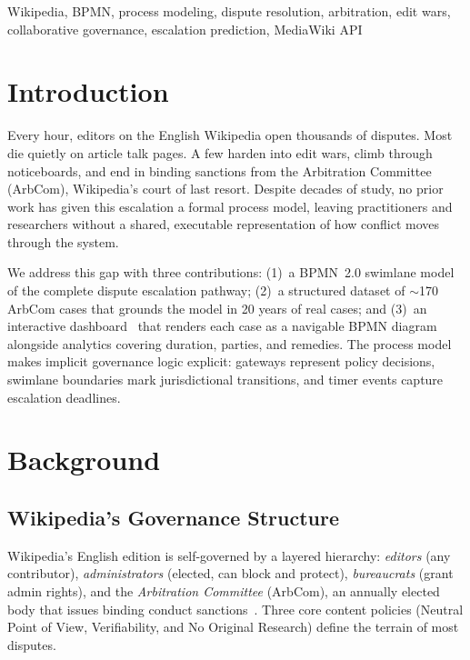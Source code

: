 \documentclass[conference]{IEEEtran}
\begin{document}
\begin{IEEEkeywords}
Wikipedia, BPMN, process modeling, dispute resolution, arbitration, edit wars,
collaborative governance, escalation prediction, MediaWiki API
\end{IEEEkeywords}

\section{Introduction}

Every hour, editors on the English Wikipedia open thousands of disputes. Most
die quietly on article talk pages. A few harden into edit wars, climb through
noticeboards, and end in binding sanctions from the Arbitration Committee
(ArbCom), Wikipedia's court of last resort. Despite decades of study, no
prior work has given this escalation a formal process model, leaving
practitioners and researchers without a shared, executable representation of
how conflict moves through the system.

We address this gap with three contributions: (1)~a BPMN~2.0 swimlane model
of the complete dispute escalation pathway; (2)~a structured dataset of
$\sim$170 ArbCom cases that grounds the model in 20 years of real cases; and
(3)~an interactive dashboard~\cite{b_dashboard} that renders each case as a
navigable BPMN diagram alongside analytics covering duration, parties, and
remedies. The process model makes implicit governance logic explicit: gateways
represent policy decisions, swimlane boundaries mark jurisdictional
transitions, and timer events capture escalation deadlines.

\section{Background}

\subsection{Wikipedia's Governance Structure}

Wikipedia's English edition is self-governed by a layered hierarchy:
\emph{editors} (any contributor), \emph{administrators} (elected, can block
and protect), \emph{bureaucrats} (grant admin rights), and the
\emph{Arbitration Committee} (ArbCom), an annually elected body that
issues binding conduct sanctions~\cite{b_wikistats}. Three core content
policies (Neutral Point of View, Verifiability, and No Original
Research) define the terrain of most disputes.
\end{document}
